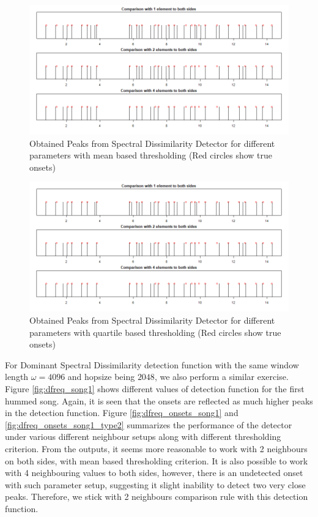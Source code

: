 \documentclass[10pt]{article}
\begin{document}
\begin{figure}
    \centering
    \includegraphics[width = \textwidth]{spectral_onsets_song1.png}
    \caption{Obtained Peaks from Spectral Dissimilarity Detector for different parameters with mean based thresholding (Red circles show true onsets)}
    \label{fig:spectral_onsets_song1}
\end{figure}

\begin{figure}
    \centering
    \includegraphics[width = \textwidth]{spectral_onsets_song1_type2.png}
    \caption{Obtained Peaks from Spectral Dissimilarity Detector for different parameters with quartile based thresholding (Red circles show true onsets)}
    \label{fig:spectral_onsets_song1_type2}
\end{figure}

For Dominant Spectral Dissimilarity detection function with the same window length $\omega = 4096$ and hopsize being $2048$, we also perform a similar exercise. Figure \ref{fig:dfreq_song1} shows different values of detection function for the first hummed song. Again, it is seen that the onsets are reflected as much higher peaks in the detection function. Figure \ref{fig:dfreq_onsets_song1} and \ref{fig:dfreq_onsets_song1_type2} summarizes the performance of the detector under various different neighbour setups along with different thresholding criterion. From the outputs, it seems more reasonable to work with 2 neighbours on both sides, with mean based thresholding criterion. It is also possible to work with 4 neighbouring values to both sides, however, there is an undetected onset with such parameter setup, suggesting it slight inability to detect two very close peaks. Therefore, we stick with 2 neighbours comparison rule with this detection function.
\end{document}
